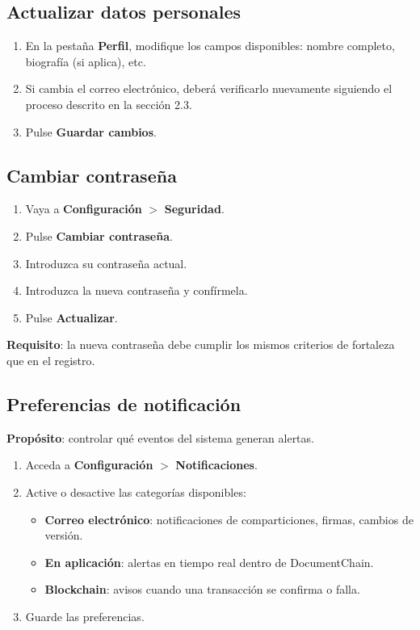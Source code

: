 \documentclass[11pt, a4paper]{article}
\begin{document}
\subsection{Actualizar datos personales}

\begin{enumerate}
    \item En la pesta\~{n}a \textbf{Perfil}, modifique los campos disponibles: nombre completo, biograf\'{i}a (si aplica), etc.
    \item Si cambia el correo electr\'{o}nico, deber\'{a} verificarlo nuevamente siguiendo el proceso descrito en la secci\'{o}n 2.3.
    \item Pulse \textbf{Guardar cambios}.
\end{enumerate}

\subsection{Cambiar contrase\~{n}a}

\begin{enumerate}
    \item Vaya a \textbf{Configuraci\'{o}n} $>$ \textbf{Seguridad}.
    \item Pulse \textbf{Cambiar contrase\~{n}a}.
    \item Introduzca su contrase\~{n}a actual.
    \item Introduzca la nueva contrase\~{n}a y conf\'{i}rmela.
    \item Pulse \textbf{Actualizar}.
\end{enumerate}

\textbf{Requisito}: la nueva contrase\~{n}a debe cumplir los mismos criterios de fortaleza que en el registro.

\subsection{Preferencias de notificaci\'{o}n}

\textbf{Prop\'{o}sito}: controlar qu\'{e} eventos del sistema generan alertas.

\begin{enumerate}
    \item Acceda a \textbf{Configuraci\'{o}n} $>$ \textbf{Notificaciones}.
    \item Active o desactive las categor\'{i}as disponibles:
    \begin{itemize}
        \item \textbf{Correo electr\'{o}nico}: notificaciones de comparticiones, firmas, cambios de versi\'{o}n.
        \item \textbf{En aplicaci\'{o}n}: alertas en tiempo real dentro de DocumentChain.
        \item \textbf{Blockchain}: avisos cuando una transacci\'{o}n se confirma o falla.
    \end{itemize}
    \item Guarde las preferencias.
\end{enumerate}
\end{document}
